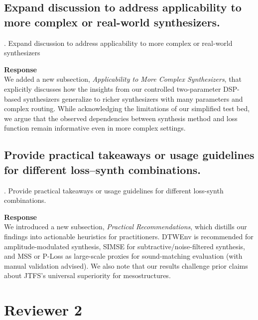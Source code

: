 \documentclass[11pt]{article}
\begin{document}
\subsection*{Expand discussion to address applicability to more complex or real-world synthesizers.}
. Expand discussion to address applicability to more complex or real-world synthesizers

\noindent\textbf{Response} \\
We added a new subsection, \emph{Applicability to More Complex Synthesizers}, that explicitly discusses how the insights from our controlled two-parameter DSP-based synthesizers generalize to richer synthesizers with many parameters and complex routing. While acknowledging the limitations of our simplified test bed, we argue that the observed dependencies between synthesis method and loss function remain informative even in more complex settings.

\subsection*{Provide practical takeaways or usage guidelines for different loss--synth combinations.}
. Provide practical takeaways or usage guidelines for different loss-synth combinations.  

\noindent\textbf{Response} \\
We introduced a new subsection, \emph{Practical Recommendations}, which distills our findings into actionable heuristics for practitioners. DTWEnv is recommended for amplitude-modulated synthesis, SIMSE for subtractive/noise-filtered synthesis, and MSS or P-Loss as large-scale proxies for sound-matching evaluation (with manual validation advised). We also note that our results challenge prior claims about JTFS’s universal superiority for mesostructures.

\section*{Reviewer 2}
\end{document}
